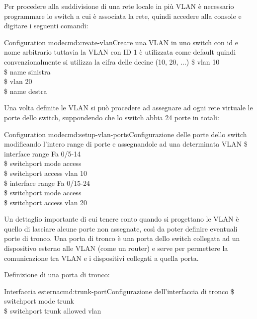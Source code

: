 Per procedere alla suddivisione di una rete locale in più VLAN è necessario programmare lo switch a cui è associata la rete, quindi accedere alla console e digitare i seguenti comandi:

\begin{cmds}[Switch]{Configuration mode}{cmd:create-vlan}{Creare una VLAN in uno switch con \textcolor{Highlight1}{id} e \textcolor{Highlight2}{nome} arbitrario tuttavia la VLAN con ID 1 è utilizzata come default quindi convenzionalmente si utilizza la cifra delle decine (10, 20, ...)}
    \$ vlan \textcolor{Highlight1}{10}\\
    \$ name \textcolor{Highlight2}{sinistra}\\
    \$ vlan \textcolor{Highlight1}{20}\\
    \$ name \textcolor{Highlight2}{destra}
\end{cmds}

Una volta definite le VLAN si può procedere ad assegnare ad ogni rete virtuale le porte dello switch, suppondendo che lo switch abbia 24 porte in totali:

\begin{cmds}{Configuration mode}{cmd:setup-vlan-ports}{Configurazione delle porte dello switch modificando l'intero \textcolor{Highlight1}{range} di porte e assegnandole ad una \textcolor{Highlight2}{determinata VLAN}}
    \$ interface range \textcolor{Highlight1}{Fa 0/5-14}\\
    \$ switchport mode access\\
    \$ switchport access \textcolor{Highlight2}{vlan 10}\\
    \$ interface range \textcolor{Highlight1}{Fa 0/15-24}\\
    \$ switchport mode access\\
    \$ switchport access \textcolor{Highlight2}{vlan 20}
\end{cmds}

Un dettaglio importante di cui tenere conto quando si progettano le VLAN è quello di lasciare alcune porte non assegnate, così da poter definire eventuali porte di tronco. Una porta di tronco è una porta dello switch collegata ad un dispositivo esterno alle VLAN (come un router) e serve per permettere la comunicazione tra VLAN e i dispositivi collegati a quella porta.

Definizione di una porta di tronco:

\begin{cmds}[Switch]{Interfaccia esterna}{cmd:trunk-port}{Configurazione dell'interfaccia di tronco}
    \$ switchport mode trunk\\
    \$ switchport trunk allowed vlan
\end{cmds}

